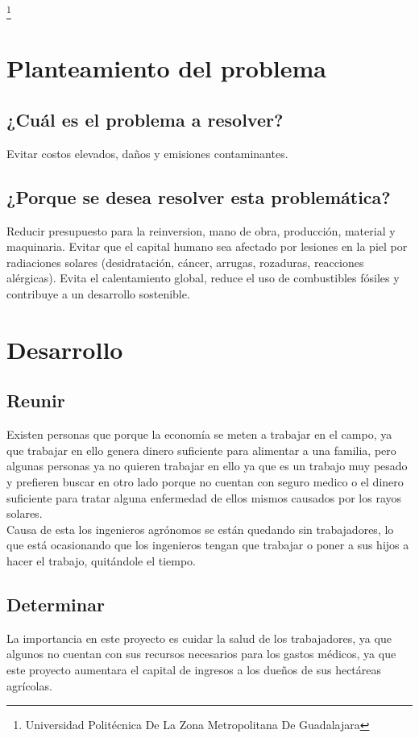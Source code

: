 \documentclass[11pt,a4paper]{article}
\begin{document}
\footnote{Universidad Politécnica De La Zona Metropolitana De Guadalajara} 

\pagebreak

\section{Planteamiento del problema}
\subsection{¿Cuál es el problema a resolver?}
Evitar costos elevados, daños y emisiones contaminantes.\\
\subsection{¿Porque se desea resolver esta problemática?}
Reducir presupuesto para la reinversion, mano de obra, producción, material y maquinaria. Evitar que el capital humano sea afectado por lesiones en la piel por radiaciones solares (desidratación, cáncer, arrugas, rozaduras, reacciones alérgicas). Evita el calentamiento global, reduce el uso de combustibles fósiles y contribuye a un desarrollo sostenible.
\section{Desarrollo} 
\subsection{Reunir}
Existen personas que porque la economía se meten a trabajar en el campo, ya que trabajar en ello genera dinero suficiente para alimentar a una familia, pero algunas personas ya no quieren trabajar en ello ya que es un trabajo muy pesado y prefieren buscar en otro lado porque no cuentan con seguro medico o el dinero suficiente para tratar alguna enfermedad de ellos mismos causados por los rayos solares.\\
Causa de esta los ingenieros agrónomos se están quedando sin trabajadores, lo que está ocasionando que los ingenieros tengan que trabajar o poner a sus hijos a hacer el trabajo, quitándole el tiempo.
\subsection{Determinar}
La importancia en este proyecto es cuidar la salud de los trabajadores, ya que algunos no cuentan con sus recursos necesarios para los gastos médicos, ya que este proyecto aumentara el capital de ingresos a los dueños de sus hectáreas agrícolas.
\end{document}
